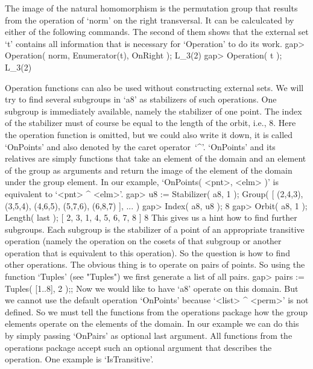 The  image  of the natural  homomorphism   is the permutation  group that
results from the operation of `norm' on the right  transversal. It can be
calculcated by either of the following commands. The second of them shows
that the external set `t' contains all information  that is necessary for
`Operation' to do its work.
\beginexample
    gap> Operation( norm, Enumerator(t), OnRight );
    L_3(2)
    gap> Operation( t );
    L_3(2)
\endexample


Operation functions can also be used  without constructing external sets.
We will  try to find  several  subgroups in `a8'   as stabilizers of such
operations. One subgroup  is immediately available, namely the stabilizer
of one point. The index of the stabilizer must  of course be equal to the
length of the orbit, i.e., 8. Here the operation function is omitted, but
we could also write it down, it is called  `OnPoints' and also denoted by
the caret operator~`^'. `OnPoints' and its relatives are simply functions
that  take an  element of  the  domain  and an  element  of the  group as
arguments  and return the  image of the element   of the domain under the
group element. In  our example, `OnPoints(  <pnt>, <elm> )' is equivalent
to `<pnt> ^ <elm>'.
\beginexample
    gap> u8 := Stabilizer( a8, 1 );
    Group( [ (2,4,3), (3,5,4), (4,6,5), (5,7,6), (6,8,7) ], ... )
    gap> Index( a8, u8 );
    8
    gap> Orbit( a8, 1 ); Length( last );
    [ 2, 3, 1, 4, 5, 6, 7, 8 ]
    8
\endexample
This gives us a hint how to find further  subgroups. Each subgroup is the
stabilizer of a point of an appropriate  transitive operation (namely the
operation  on  the cosets of that  subgroup  or another operation that is
equivalent to  this operation).  So the question   is how  to find  other
operations. The obvious thing is to operate  on pairs of points. So using
the function `Tuples'  (see  "Tuples") we first generate  a  list  of all
pairs.
\beginexample
    gap> pairs := Tuples( [1..8], 2 );;
\endexample
Now we would like to have `a8' operate on this  domain. But we cannot use
the  default operation `OnPoints'  because    `<list> ^ <perm>' is    not
defined. So we  must tell the functions  from the operations package  how
the group elements operate on the elements of  the domain. In our example
we can do this by simply passing `OnPairs' as optional last argument. All
functions  from the operations package  accept  such an optional argument
that describes the operation. One example is `IsTransitive'.
